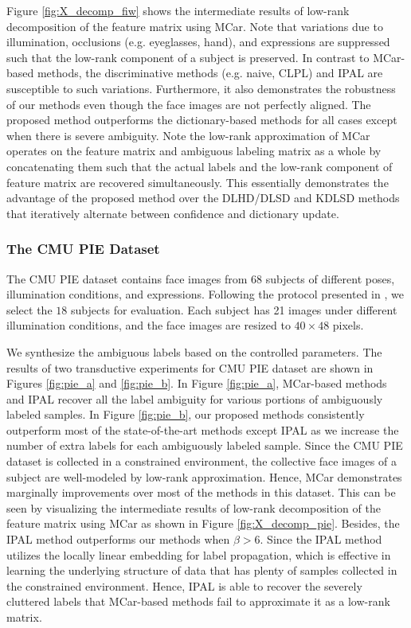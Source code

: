 \documentclass[10pt,journal,compsoc]{IEEEtran}
\begin{document}
Figure \ref{fig:X_decomp_fiw} shows the intermediate results of low-rank decomposition of the feature matrix using MCar. Note that variations due to illumination, occlusions (e.g. eyeglasses, hand), and expressions are suppressed such that the low-rank component of a subject is preserved. In contrast to MCar-based methods, the discriminative methods (e.g. naive, CLPL) and IPAL are susceptible to such variations. Furthermore, it also demonstrates the robustness of our methods even though the face images are not perfectly aligned. The proposed method outperforms the dictionary-based methods \cite{Chen2013,Chen2014all} for all cases except when there is severe ambiguity. Note the low-rank approximation of MCar operates on the feature matrix and ambiguous labeling matrix as a whole by concatenating them such that the actual labels and the low-rank component of feature matrix are recovered simultaneously. This essentially demonstrates the advantage of the proposed method over the DLHD/DLSD and KDLSD methods that iteratively alternate between confidence and dictionary update.





\subsubsection{The CMU PIE Dataset}


The CMU PIE dataset contains face images from $68$ subjects of different poses, illumination conditions, and expressions.
Following the protocol presented in \cite{Chen2013}, we select the $18$ subjects for evaluation. Each subject has 21 images under different illumination conditions, and the face images are resized to $40 \times 48$ pixels.

We synthesize the ambiguous labels based on the controlled parameters. The results of two transductive experiments for CMU PIE dataset are shown in Figures \ref{fig:pie_a} and \ref{fig:pie_b}. In Figure \ref{fig:pie_a}, MCar-based methods and IPAL recover all the label ambiguity for various portions of ambiguously labeled samples. In Figure \ref{fig:pie_b}, our proposed methods consistently outperform most of the state-of-the-art methods except IPAL as we increase the number of extra labels for each ambiguously labeled sample. Since the CMU PIE dataset is collected in a constrained environment, the collective face images of a subject are well-modeled by low-rank approximation. Hence, MCar demonstrates marginally improvements over most of the methods in this dataset. This can be seen by visualizing the intermediate results of low-rank decomposition of the feature matrix using MCar as shown in Figure \ref{fig:X_decomp_pie}. Besides, the IPAL method outperforms our methods when $\beta > 6$. Since the IPAL method utilizes the locally linear embedding for label propagation, which is effective in learning the underlying structure of data that has plenty of samples collected in the constrained environment. Hence, IPAL is able to recover the severely cluttered labels that MCar-based methods fail to approximate it as a low-rank matrix.
\end{document}
